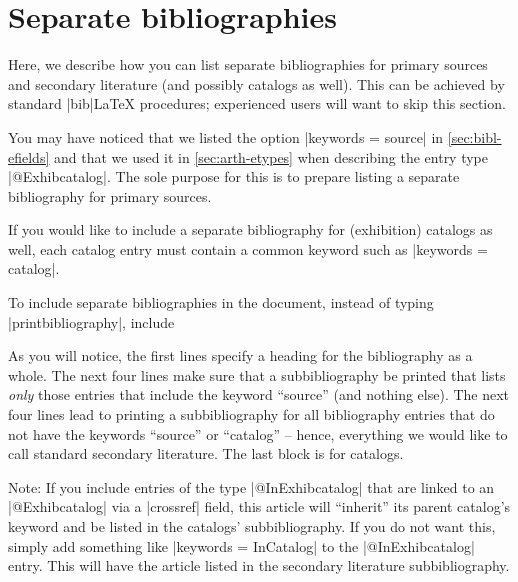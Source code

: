 \documentclass[a4paper,
10pt,
ngerman,
english
]{ltxdoc}
\begin{document}
\section{Separate bibliographies}\label{sec:sepbib}
Here, we describe how you can list separate bibliographies for primary sources and secondary literature (and possibly catalogs as well). This can be achieved by standard |bib|\LaTeX{} procedures; experienced users will want to skip this section.

You may have noticed that we listed the option |keywords = {source}| in \cref{sec:bibl-efields} and that we used it in \cref{sec:arth-etypes} when describing the entry type |@Exhibcatalog|. The sole purpose for this is to prepare listing a separate bibliography for primary sources.

If you would like to include a separate bibliography for (exhibition) catalogs as well, each catalog entry must contain a common keyword such as |keywords = {catalog}|.

To include separate bibliographies in the document, instead of typing |printbibliography|, include
\begin{code}
\printbibheading[%
  heading=bibliography,%
  title={Bibliography}]
\printbibliography[%
  keyword=source,%
  heading=subbibliography,
  title={Primary sources}]
\printbibliography[%
  notkeyword=catalog,%
  notkeyword=source,%
  heading=subbibliography,%
  title={Secondary literature}]
\printbibliography[%
  keyword=catalog,%
  heading=subbibliography,%
  title={Exhibition catalogs}]
\end{code}
As you will notice, the first lines specify a heading for the bibliography as a whole. The next four lines make sure that a subbibliography be printed that lists \emph{only} those entries that include the keyword \enquote{source} (and nothing else). The next four lines lead to printing a subbibliography for all bibliography entries that do not have the keywords \enquote{source} or \enquote{catalog} -- hence, everything we would like to call standard secondary literature. The last block is for catalogs.

Note: If you include entries of the type |@InExhibcatalog| that are linked to an |@Exhibcatalog| via a |crossref| field, this article will \enquote{inherit} its parent catalog's keyword and be listed in the catalogs' subbibliography. If you do not want this, simply add something like |keywords = {InCatalog}| to the |@InExhibcatalog| entry. This will have the article listed in the secondary literature subbibliography.
\end{document}
